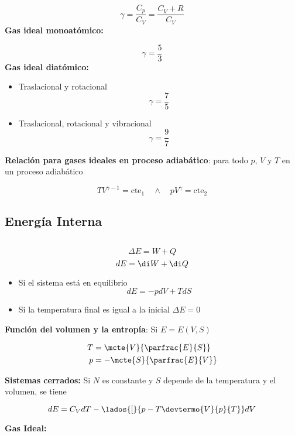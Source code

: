 \[\gamma = \frac{C_p}{C_V} = \frac{C_V+R}{C_V}\]
\bigbreak
\textbf{Gas ideal monoatómico:}

\[\gamma = \frac{5}{3}\]
\bigbreak
\textbf{Gas ideal diatómico:}

\begin{itemize}
    \item Traslacional y rotacional
    \[\gamma = \frac{7}{5}\]
    \item Traslacional, rotacional y vibracional
    \[\gamma = \frac{9}{7}\]
\end{itemize}

\textbf{Relación para gases ideales en proceso adiabático}: para todo $p$, $V$ y $T$ en un proceso adiabático

\[TV^{\gamma -1} = \text{cte}_1 \quad \land \quad pV^\gamma = \text{cte}_2\]

\subsection{Energía Interna}
$\,$\\



\[\Delta E = W+Q\]
\[dE = \di W+ \di Q\]

\begin{itemize}
    \item Si el sistema está en equilibrio
    \[dE = -pdV + TdS\]
    \item Si la temperatura final es igual a la inicial $\Delta E=0$
\end{itemize}

\bigbreak

\textbf{Función del volumen y la entropía}: Si $E=E(V,S)$

\begin{equation}
\begin{split}
    T&=\mcte{V}{\parfrac{E}{S}}\\
    p&=-\mcte{S}{\parfrac{E}{V}}\\
\end{split}
\nonumber
\end{equation}

\bigbreak

\textbf{Sistemas cerrados:} Si $N$ es constante y $S$ depende de la temperatura y el volumen, se tiene

\[dE = C_VdT - \lados{[}{p-T\devtermo{V}{p}{T}}dV\]

\textbf{Gas Ideal:}

